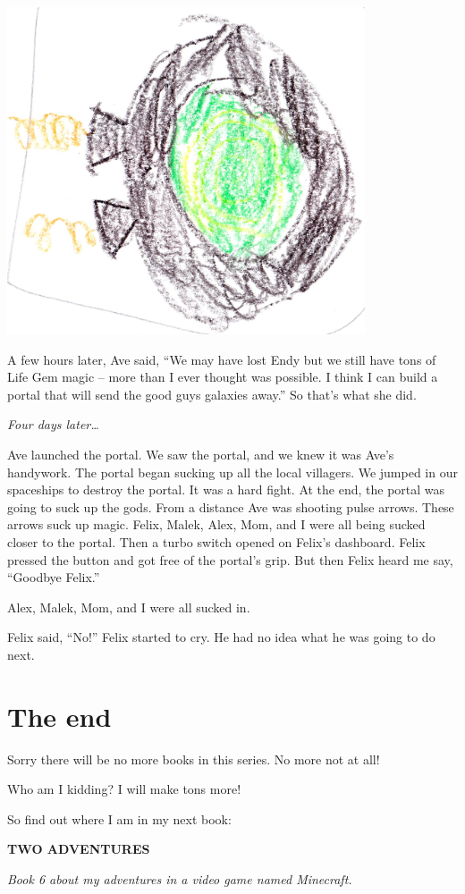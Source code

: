 \documentclass[letterpaper, oneside, 12pt]{krantz}
\begin{document}
\includegraphics[width=4.16667in,height=\textheight]{img/four-bad-guys/portal.jpg}

A few hours later, Ave said, ``We may have lost Endy but we still have
tons of Life Gem magic -- more than I ever thought was possible. I think
I can build a portal that will send the good guys galaxies away.'' So
that's what she did.

\emph{Four days later\ldots{}}

Ave launched the portal. We saw the portal, and we knew it was Ave's
handywork. The portal began sucking up all the local villagers. We
jumped in our spaceships to destroy the portal. It was a hard fight. At
the end, the portal was going to suck up the gods. From a distance Ave
was shooting pulse arrows. These arrows suck up magic. Felix, Malek,
Alex, Mom, and I were all being sucked closer to the portal. Then a
turbo switch opened on Felix's dashboard. Felix pressed the button and
got free of the portal's grip. But then Felix heard me say, ``Goodbye
Felix.''

Alex, Malek, Mom, and I were all sucked in.

Felix said, ``No!'' Felix started to cry. He had no idea what he was
going to do next.

\hypertarget{the-end-1}{%
\section{The end}\label{the-end-1}}

Sorry there will be no more books in this series. No more not at all!

Who am I kidding? I will make tons more!

So find out where I am in my next book:

\textbf{TWO ADVENTURES}

\emph{Book 6 about my adventures in a video game named Minecraft.}
\end{document}
